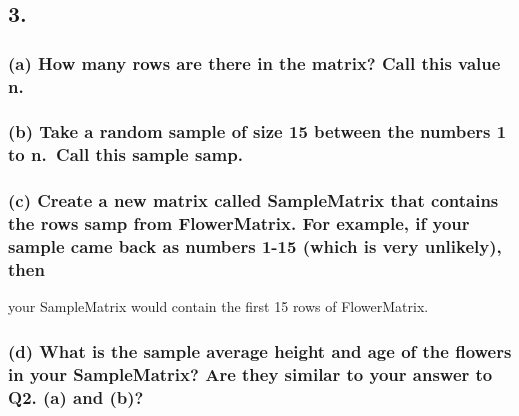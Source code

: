 \documentclass[
]{article}
\begin{document}
\hypertarget{section-1}{%
\subsection{3.}\label{section-1}}

\hypertarget{a-how-many-rows-are-there-in-the-matrix-call-this-value-n.}{%
\subsubsection{(a) How many rows are there in the matrix? Call this
value
n.}\label{a-how-many-rows-are-there-in-the-matrix-call-this-value-n.}}

\hypertarget{b-take-a-random-sample-of-size-15-between-the-numbers-1-to-n.-call-this-sample-samp.}{%
\subsubsection{(b) Take a random sample of size 15 between the numbers 1
to n.~Call this sample
samp.}\label{b-take-a-random-sample-of-size-15-between-the-numbers-1-to-n.-call-this-sample-samp.}}

\hypertarget{c-create-a-new-matrix-called-samplematrix-that-contains-the-rows-samp-from-flowermatrix.-for-example-if-your-sample-came-back-as-numbers-1-15-which-is-very-unlikely-then}{%
\subsubsection{(c) Create a new matrix called SampleMatrix that contains
the rows samp from FlowerMatrix. For example, if your sample came back
as numbers 1-15 (which is very unlikely),
then}\label{c-create-a-new-matrix-called-samplematrix-that-contains-the-rows-samp-from-flowermatrix.-for-example-if-your-sample-came-back-as-numbers-1-15-which-is-very-unlikely-then}}

your SampleMatrix would contain the first 15 rows of FlowerMatrix.

\hypertarget{d-what-is-the-sample-average-height-and-age-of-the-flowers-in-your-samplematrix-are-they-similar-to-your-answer-to-q2.-a-and-b}{%
\subsubsection{(d) What is the sample average height and age of the
flowers in your SampleMatrix? Are they similar to your answer to Q2. (a)
and
(b)?}\label{d-what-is-the-sample-average-height-and-age-of-the-flowers-in-your-samplematrix-are-they-similar-to-your-answer-to-q2.-a-and-b}}
\end{document}
